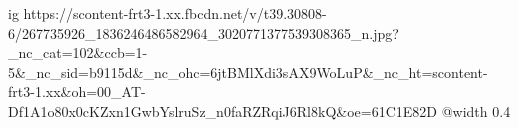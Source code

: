  
 
 
 
 

\ifcmt
  ig https://scontent-frt3-1.xx.fbcdn.net/v/t39.30808-6/267735926_1836246486582964_3020771377539308365_n.jpg?_nc_cat=102&ccb=1-5&_nc_sid=b9115d&_nc_ohc=6jtBMlXdi3sAX9WoLuP&_nc_ht=scontent-frt3-1.xx&oh=00_AT-Df1A1o80x0cKZxn1GwbYslruSz_n0faRZRqiJ6Rl8kQ&oe=61C1E82D
  @width 0.4
\fi
